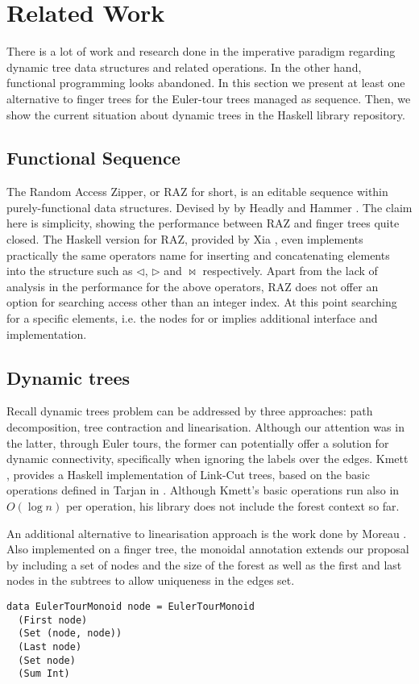 \section{Related Work} 
\label{sec:RelWrk} 

There is a lot of work and research done in the imperative paradigm regarding dynamic tree data structures and related operations. In the other hand, functional programming looks abandoned. In this section we present at least one alternative to finger trees for the Euler-tour trees managed as sequence. Then, we show the current situation about dynamic trees in the Haskell library repository.

\subsection{Functional Sequence}
The Random Access Zipper, or RAZ for short, is an editable sequence within purely-functional data structures. Devised by by Headly and Hammer \cite{RAZ}. The claim here is simplicity, showing the performance between RAZ and finger trees quite closed. The Haskell version for RAZ, provided by Xia \cite{HaskellRAZ}, even implements practically the same operators name for inserting and concatenating elements into the structure such as $\lhd$, $\rhd$ and $\bowtie$ respectively. Apart from the lack of analysis in the performance for the above operators, RAZ does not offer an option for searching access other than an integer index. At this point searching for a specific elements, i.e. the nodes for \link or \cut implies additional interface and implementation.

\subsection{Dynamic trees}

Recall dynamic trees problem can be addressed by three approaches: path decomposition, tree contraction and linearisation. Although our attention was in the latter, through Euler tours, the former can potentially offer a solution for dynamic connectivity, specifically when ignoring the labels over the edges. Kmett \cite{HaskellLC}, provides a Haskell implementation of Link-Cut trees, based on the basic operations defined in Tarjan in \cite{LittleBook}. Although Kmett's basic operations run also in $O(\log n)$ per operation, his library does not include the forest context so far. 

An additional alternative to linearisation approach is the work done by Moreau \cite{HaskellET}. Also implemented on a finger tree, the monoidal annotation extends our proposal by including a set of nodes and the size of the forest as well as the first and last nodes in the subtrees to allow uniqueness in the edges set.
\begin{lstlisting}[mathescape]
data EulerTourMonoid node = EulerTourMonoid
  (First node)
  (Set (node, node))
  (Last node)
  (Set node)
  (Sum Int)
\end{lstlisting} 

